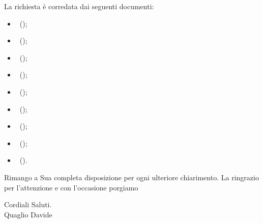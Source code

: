 \documentclass[11pt,a4paper]{article}
\begin{document}
La richiesta è corredata dai seguenti documenti:
\begin{itemize}
\item \infoAR ~(\AnalisiDeiRequisiti);
\item \infoPDP ~(\PianoDiProgetto);
\item \infoPDQ ~(\PianoDiQualifica);
\item \infoNDP ~(\NormeDiProgetto);
\item \infoDP ~(\DefinizioneDiProdotto);
\item \infoMPO ~(\ManualePO);
\item \infoMU ~(\ManualeUtente);
\item \infoG ~(\Glossario);
\item \infoST ~(\SpecificaTecnica). 
\end{itemize}

Rimango a Sua completa disposizione per ogni ulteriore chiarimento.
La ringrazio per l'attenzione e con l'occasione porgiamo\\
\begin{flushright}
Cordiali Saluti.\\
Quaglio Davide
\end{flushright}
\end{document}
